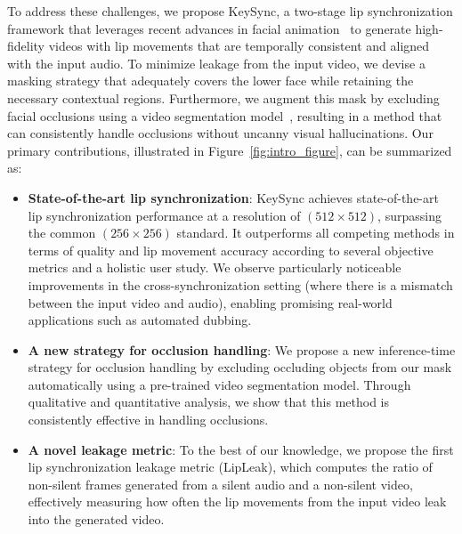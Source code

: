 To address these challenges, we propose KeySync, a two-stage lip synchronization framework that leverages recent advances in facial animation~\cite{keyface} to generate high-fidelity videos with lip movements that are temporally consistent and aligned with the input audio. To minimize leakage from the input video, we devise a masking strategy that adequately covers the lower face while retaining the necessary contextual regions. Furthermore, we augment this mask by excluding facial occlusions using a video segmentation model~\cite{sam2}, resulting in a method that can consistently handle occlusions without uncanny visual hallucinations. Our primary contributions, illustrated in Figure~\ref{fig:intro_figure}, can be summarized as:
\begin{itemize}
    \item \textbf{State-of-the-art lip synchronization}: KeySync achieves state-of-the-art lip synchronization performance at a resolution of $(512\times512)$,  surpassing the common $(256\times256)$ standard. It outperforms all competing methods in terms of quality and lip movement accuracy according to several objective metrics and a holistic user study. We observe particularly noticeable improvements in the cross-synchronization setting (where there is a mismatch between the input video and audio), enabling promising real-world applications such as automated dubbing.
    \item \textbf{A new strategy for occlusion handling}: We propose a new inference-time strategy for occlusion handling by excluding occluding objects from our mask automatically using a pre-trained video segmentation model. Through qualitative and quantitative analysis, we show that this method is consistently effective in handling occlusions.
    \item \textbf{A novel leakage metric}: To the best of our knowledge, we propose the first lip synchronization leakage metric (LipLeak), which computes the ratio of non-silent frames generated from a silent audio and a non-silent video, effectively measuring how often the lip movements from the input video leak into the generated video.
\end{itemize}
